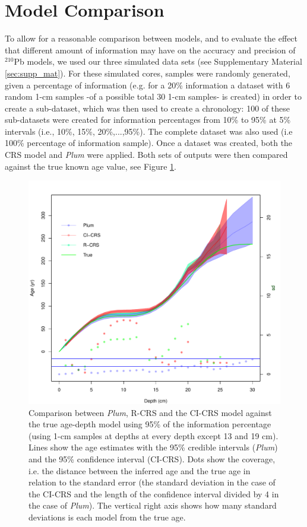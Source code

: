\documentclass [10pt] {article}
\begin{document}
\section{Model Comparison}

To allow for a reasonable comparison between models, and to evaluate the effect that different amount of information may have on the accuracy and precision of $^{210}$Pb models, we used our three simulated data sets (see Supplementary Material \ref{sec:supp_mat}). 
For these simulated cores, samples were randomly generated, given a percentage of information (e.g. for a 20\% information a dataset with 6 random 1-cm samples -of a possible total 30 1-cm samples- is created) in order to create a sub-dataset, which was then used to create a chronology:
100 of these sub-datasets were created for information percentages from 10\% to 95\% at 5\% intervals (i.e., 10\%, 15\%, 20\%,...,95\%). 
The complete dataset was also used (i.e 100\% percentage of information sample).
Once a dataset was created, both the CRS model and \textit{Plum} were applied.  
Both sets of outputs were then compared against the true known age value, see Figure \ref{fig:comparison1r}.

\begin{figure}[!]
	\centering
	\includegraphics[width=\linewidth]{95Comparison.pdf}
		\caption{Comparison between \textit{Plum}, R-CRS and the CI-CRS model against the true age-depth model using 95\% of the information percentage (using 1-cm samples at depths at every depth except 13 and 19 cm). Lines show the age estimates with the 95\% credible intervals (\textit{Plum}) and the 95\% confidence interval (CI-CRS). Dots show the coverage, i.e. the distance between the inferred age and the true age in relation to the standard error (the standard deviation in the case of the CI-CRS and the length of the confidence interval divided by 4 in the case of \textit{Plum}). The vertical right axis shows how many standard deviations is each model from the true age.  }
		\label{fig:comparison1r}
\end{figure}
\end{document}

